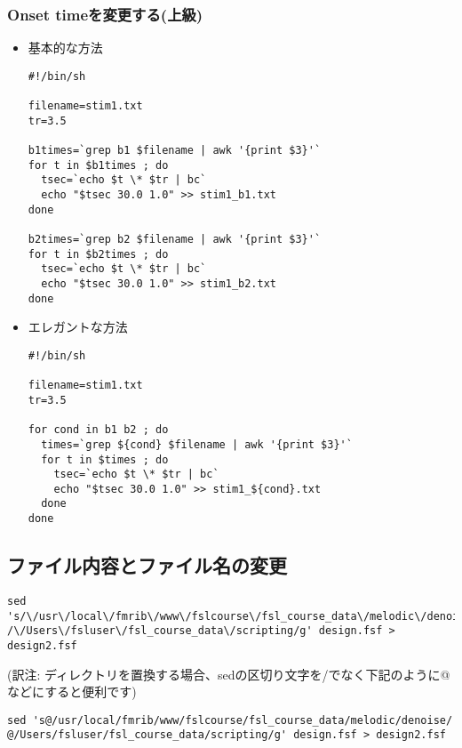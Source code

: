 \documentclass{jsarticle}
\begin{document}
\subsubsection{Onset timeを変更する(上級)}

\begin{itemize}
\item 基本的な方法

\begin{verbatim}
#!/bin/sh

filename=stim1.txt
tr=3.5

b1times=`grep b1 $filename | awk '{print $3}'`
for t in $b1times ; do
  tsec=`echo $t \* $tr | bc`
  echo "$tsec 30.0 1.0" >> stim1_b1.txt
done

b2times=`grep b2 $filename | awk '{print $3}'`
for t in $b2times ; do
  tsec=`echo $t \* $tr | bc`
  echo "$tsec 30.0 1.0" >> stim1_b2.txt
done
\end{verbatim}


\item エレガントな方法

\begin{verbatim}
#!/bin/sh

filename=stim1.txt
tr=3.5

for cond in b1 b2 ; do
  times=`grep ${cond} $filename | awk '{print $3}'`
  for t in $times ; do
    tsec=`echo $t \* $tr | bc`
    echo "$tsec 30.0 1.0" >> stim1_${cond}.txt
  done
done
\end{verbatim}

\end{itemize}

\subsection{ファイル内容とファイル名の変更}

\begin{verbatim}
sed 's/\/usr\/local\/fmrib\/www\/fslcourse\/fsl_course_data\/melodic\/denoise
/\/Users\/fsluser\/fsl_course_data\/scripting/g' design.fsf > design2.fsf
\end{verbatim}

\noindent (訳注: ディレクトリを置換する場合、sedの区切り文字を/でなく下記のように@などにすると便利です)

\begin{verbatim}
sed 's@/usr/local/fmrib/www/fslcourse/fsl_course_data/melodic/denoise/
@/Users/fsluser/fsl_course_data/scripting/g' design.fsf > design2.fsf
\end{verbatim}
\end{document}
